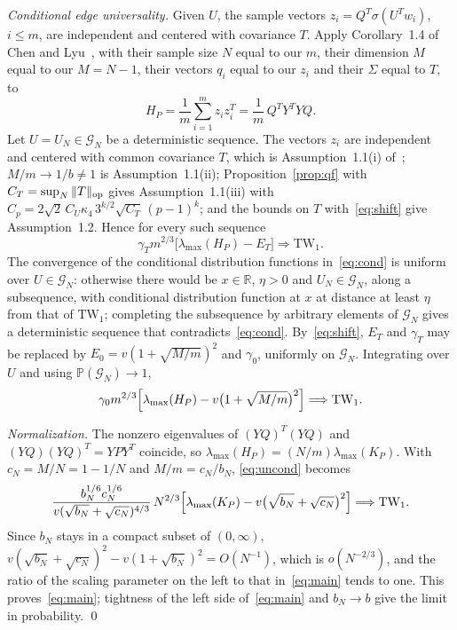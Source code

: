\documentclass[11pt]{amsart}
\theoremstyle{remark}
\numberwithin{equation}{section}
\newcommand{\PP}{\mathbb{P}}
\newcommand{\RR}{\mathbb{R}}
\newcommand{\TW}{\mathrm{TW}_1}
\begin{document}
\emph{Conditional edge universality.} Given $U$, the sample vectors $z_i=Q^{T}\sigma(U^{T}w_i)$, $i\le m$, are independent and centered with covariance $T$. Apply Corollary~1.4 of Chen and Lyu~\cite{CL}, with their sample size $N$ equal to our $m$, their dimension $M$ equal to our $M=N-1$, their vectors $q_i$ equal to our $z_i$ and their $\Sigma$ equal to $T$, to
\[
H_P=\frac1m\sum_{i=1}^{m}z_iz_i^{T}=\frac1m\,Q^{T}Y^{T}YQ.
\]
Let $U=U_N\in\mathcal G_N$ be a deterministic sequence. The vectors $z_i$ are independent and centered with common covariance $T$, which is Assumption~1.1(i) of~\cite{CL}; $M/m\to1/b\ne1$ is Assumption~1.1(ii); Proposition~\ref{prop:qf} with $C_T=\sup_N\|T\|_{\rm op}$ gives Assumption~1.1(iii) with $C_p=2\sqrt2\,C_U\kappa_4\,3^{k/2}\sqrt{C_T}\,(p-1)^{k}$; and the bounds on $T$ with~\eqref{eq:shift} give Assumption~1.2. Hence for every such sequence
\begin{equation}\label{eq:cond}
\gamma_Tm^{2/3}\bigl[\lambda_{\max}(H_P)-E_T\bigr]\Longrightarrow\TW.
\end{equation}
The convergence of the conditional distribution functions in~\eqref{eq:cond} is uniform over $U\in\mathcal G_N$: otherwise there would be $x\in\RR$, $\eta>0$ and $U_N\in\mathcal G_N$, along a subsequence, with conditional distribution function at $x$ at distance at least $\eta$ from that of $\TW$; completing the subsequence by arbitrary elements of $\mathcal G_N$ gives a deterministic sequence that contradicts~\eqref{eq:cond}. By~\eqref{eq:shift}, $E_T$ and $\gamma_T$ may be replaced by $E_0=v(1+\sqrt{M/m})^2$ and $\gamma_0$, uniformly on $\mathcal G_N$. Integrating over $U$ and using $\PP(\mathcal G_N)\to1$,
\begin{equation}\label{eq:uncond}
\gamma_0m^{2/3}\Bigl[\lambda_{\max}(H_P)-v\bigl(1+\sqrt{M/m}\bigr)^2\Bigr]\Longrightarrow\TW.
\end{equation}

\emph{Normalization.} The nonzero eigenvalues of $(YQ)^{T}(YQ)$ and $(YQ)(YQ)^{T}=YPY^{T}$ coincide, so $\lambda_{\max}(H_P)=(N/m)\lambda_{\max}(K_P)$. With $c_N=M/N=1-1/N$ and $M/m=c_N/b_N$, \eqref{eq:uncond} becomes
\[
\frac{b_N^{1/6}c_N^{1/6}}{v(\sqrt{b_N}+\sqrt{c_N})^{4/3}}\,N^{2/3}\Bigl[\lambda_{\max}(K_P)-v\bigl(\sqrt{b_N}+\sqrt{c_N}\bigr)^2\Bigr]\Longrightarrow\TW.
\]
Since $b_N$ stays in a compact subset of $(0,\infty)$, $v(\sqrt{b_N}+\sqrt{c_N})^2-v(1+\sqrt{b_N})^2=O(N^{-1})$, which is $o(N^{-2/3})$, and the ratio of the scaling parameter on the left to that in~\eqref{eq:main} tends to one. This proves~\eqref{eq:main}; tightness of the left side of~\eqref{eq:main} and $b_N\to b$ give the limit in probability. \qed
\end{document}
